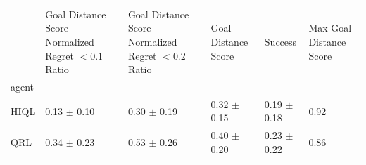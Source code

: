 \begin{tabular}{llllll}
\toprule
 & Goal Distance Score Normalized Regret $< 0.1$ Ratio & Goal Distance Score Normalized Regret $< 0.2$ Ratio & Goal Distance Score & Success & Max Goal Distance Score \\
agent &  &  &  &  &  \\
\midrule
HIQL & 0.13 $\pm$ 0.10 & 0.30 $\pm$ 0.19 & 0.32 $\pm$ 0.15 & 0.19 $\pm$ 0.18 & 0.92 \\
QRL & 0.34 $\pm$ 0.23 & 0.53 $\pm$ 0.26 & 0.40 $\pm$ 0.20 & 0.23 $\pm$ 0.22 & 0.86 \\
\bottomrule
\end{tabular}
